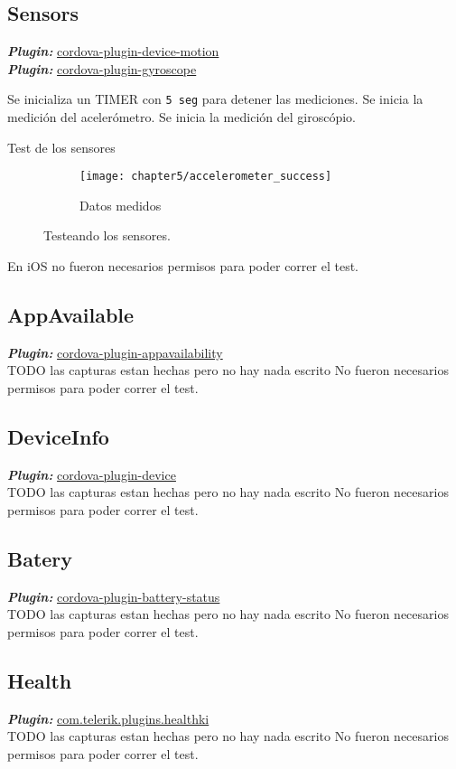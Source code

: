 \subsection*{Sensors}
\textbf{\emph{Plugin:}} \href{https://www.npmjs.com/package/cordova-plugin-device-motion}{cordova-plugin-device-motion}\\
\textbf{\emph{Plugin:}} \href{https://www.npmjs.com/package/cordova-plugin-gyroscope}{cordova-plugin-gyroscope}\\
\begin{algorithm}
	\begin{algorithmic}[1]
		\STATE Se inicializa un TIMER con \texttt{5 seg} para detener las mediciones.
		\STATE Se inicia la medici\'on del aceler\'ometro.
		\STATE Se inicia la medici\'on del girosc\'opio.
	\end{algorithmic}
	\caption{Test de los sensores}\label{alg:chap5_test_sensors}
\end{algorithm}
\begin{figure}[!ht]
	\begin{subfigure}{.32\textwidth}
	    \centering
		\texttt{[image: chapter5/accelerometer\_success]}
		\caption{Datos medidos}
		\label{fig:chapter05:accelerometer_success}
	\end{subfigure}
	\caption{Testeando los sensores.}
	\label{fig:chapter05:sensors_test}
\end{figure}
En iOS no fueron necesarios permisos para poder correr el test.

\subsection*{AppAvailable}
\textbf{\emph{Plugin:}} \href{https://www.npmjs.com/package/cordova-plugin-appavailability}{cordova-plugin-appavailability}\\
TODO las capturas estan hechas pero no hay nada escrito
No fueron necesarios permisos para poder correr el test.
\subsection*{DeviceInfo}
\textbf{\emph{Plugin:}} \href{https://www.npmjs.com/package/cordova-plugin-device}{cordova-plugin-device}\\
TODO las capturas estan hechas pero no hay nada escrito
No fueron necesarios permisos para poder correr el test.
\subsection*{Batery}
\textbf{\emph{Plugin:}} \href{https://github.com/apache/cordova-plugin-battery-status}{cordova-plugin-battery-status}\\
TODO las capturas estan hechas pero no hay nada escrito
No fueron necesarios permisos para poder correr el test.
\subsection*{Health}
\textbf{\emph{Plugin:}} \href{https://github.com/Telerik-Verified-Plugins/HealthKit}{com.telerik.plugins.healthki}\\
TODO las capturas estan hechas pero no hay nada escrito
No fueron necesarios permisos para poder correr el test.